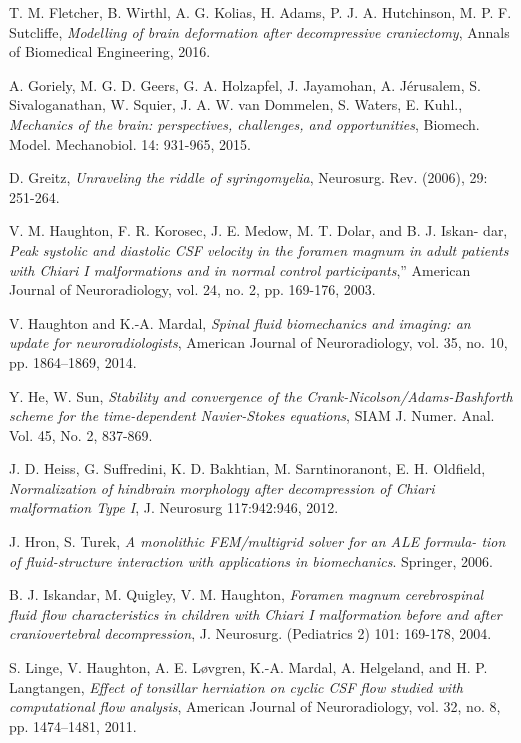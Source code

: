 \documentclass[a4paper,11pt,openright,twoside]{book}
\begin{document}
\begin{thebibliography}{100}
 T. M. Fletcher, B. Wirthl, A. G. Kolias, H. Adams, P. J. A. Hutchinson, M. P. F. Sutcliffe, \emph{Modelling of brain deformation after decompressive craniectomy}, Annals of Biomedical Engineering, 2016.

 A. Goriely, M. G. D. Geers, G. A. Holzapfel, J. Jayamohan, A. Jérusalem, S. Sivaloganathan, W. Squier, J. A. W. van Dommelen, S. Waters, E. Kuhl., \emph{Mechanics of the brain: perspectives, challenges, and opportunities}, Biomech. Model. Mechanobiol. 14: 931-965, 2015.


 D. Greitz, \emph{Unraveling the riddle of syringomyelia}, Neurosurg. Rev. (2006), 29: 251-264.

 V. M. Haughton, F. R. Korosec, J. E. Medow, M. T. Dolar, and B. J. Iskan- dar, \emph{Peak systolic and diastolic CSF velocity in the foramen magnum in adult patients with Chiari I malformations and in normal control participants},” American Journal of Neuroradiology, vol. 24, no. 2, pp. 169-176, 2003.

 V. Haughton and K.-A. Mardal, \emph{Spinal fluid biomechanics and imaging: an update for neuroradiologists}, American Journal of Neuroradiology, vol. 35, no. 10, pp. 1864–1869, 2014.


 Y. He, W. Sun, \emph{Stability and convergence of the Crank-Nicolson/Adams-Bashforth scheme for the time-dependent Navier-Stokes equations}, SIAM J. Numer. Anal. Vol. 45, No. 2, 837-869.

 J. D. Heiss, G. Suffredini, K. D. Bakhtian, M. Sarntinoranont, E. H. Oldfield, \emph{Normalization of hindbrain morphology after decompression of Chiari malformation Type I}, J. Neurosurg 117:942:946, 2012.


 J. Hron, S. Turek, \emph{A monolithic FEM/multigrid solver for an ALE formula- tion of fluid-structure interaction with applications in biomechanics}. Springer, 2006.

 B. J. Iskandar, M. Quigley, V. M. Haughton, \emph{Foramen magnum cerebrospinal fluid flow characteristics in children with Chiari I malformation before and after craniovertebral decompression}, J. Neurosurg. (Pediatrics 2) 101: 169-178, 2004.


  S. Linge, V. Haughton, A. E. Løvgren, K.-A. Mardal, A. Helgeland, and H. P. Langtangen, \emph{Effect of tonsillar herniation on cyclic CSF flow studied with computational flow analysis}, American Journal of Neuroradiology, vol. 32, no. 8, pp. 1474–1481, 2011.


\end{thebibliography}
\end{document}
